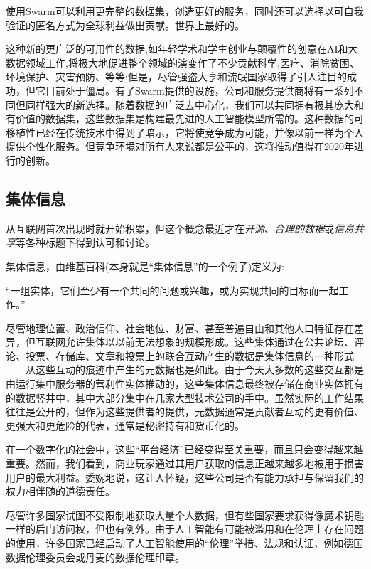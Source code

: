 使用Swarm可以利用更完整的数据集，创造更好的服务，同时还可以选择以可自我验证的匿名方式为全球利益做出贡献。世界上最好的。

这种新的更广泛的可用性的数据,如年轻学术和学生创业与颠覆性的创意在AI和大数据领域工作,将极大地促进整个领域的演变作了不少贡献科学,医疗、消除贫困、环境保护、灾害预防、等等;但是，尽管强盗大亨和流氓国家取得了引人注目的成功，但它目前处于僵局。有了Swarm提供的设施，公司和服务提供商将有一系列不同但同样强大的新选择。随着数据的广泛去中心化，我们可以共同拥有极其庞大和有价值的数据集，这些数据集是构建最先进的人工智能模型所需的。这种数据的可移植性已经在传统技术中得到了暗示，它将使竞争成为可能，并像以前一样为个人提供个性化服务。但竞争环境对所有人来说都是公平的，这将推动值得在2020年进行的创新。 



\subsection{集体信息\statusgreen}\label{sec:collective_information}

从互联网首次出现时就开始积累，但这个概念最近才在\emph{开源}、\emph{合理的数据}或\emph{信息共享}等各种标题下得到认可和讨论。

集体信息，由维基百科(本身就是“集体信息”的一个例子)定义为:
\begin{displayquote}
“一组实体，它们至少有一个共同的问题或兴趣，或为实现共同的目标而一起工作。” 
\end{displayquote}
尽管地理位置、政治信仰、社会地位、财富、甚至普遍自由和其他人口特征存在差异，但互联网允许集体以以前无法想象的规模形成。这些集体通过在公共论坛、评论、投票、存储库、文章和投票上的联合互动产生的数据是集体信息的一种形式——从这些互动的痕迹中产生的元数据也是如此。由于今天大多数的这些交互都是由运行集中服务器的营利性实体推动的，这些集体信息最终被存储在商业实体拥有的数据竖井中，其中大部分集中在几家大型技术公司的手中。虽然实际的工作结果往往是公开的，但作为这些提供者的提供，元数据通常是贡献者互动的更有价值、更强大和更危险的代表，通常是秘密持有和货币化的。

在一个数字化的社会中，这些“平台经济”已经变得至关重要，而且只会变得越来越重要。然而，我们看到，商业玩家通过其用户获取的信息正越来越多地被用于损害用户的最大利益。委婉地说，这让人怀疑，这些公司是否有能力承担与保留我们的权力相伴随的道德责任。

尽管许多国家试图不受限制地获取大量个人数据，但有些国家要求获得像魔术钥匙一样的后门访问权，但也有例外。由于人工智能有可能被滥用和在伦理上存在问题的使用，许多国家已经启动了人工智能使用的“伦理”举措、法规和认证，例如德国数据伦理委员会或丹麦的数据伦理印章。

